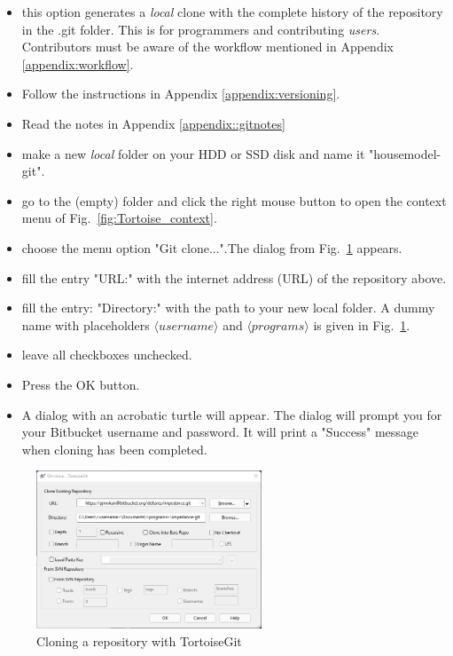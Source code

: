 \begin{itemize}
	\item this option generates a \emph{local} clone with the complete history of the repository in the \textsf{.git} folder. This is for programmers and contributing \emph{users}. Contributors must be aware of the workflow mentioned in Appendix \ref{appendix:workflow}.
    \item Follow the instructions in Appendix \ref{appendix:versioning}. 
    \item Read the notes in Appendix \ref{appendix::gitnotes}
	\item make a new \emph{local} folder on your HDD or SSD disk and name it \textsf{"housemodel-git"}.
	\item go to the (empty) folder and click the right mouse button to open the context menu of Fig.~\ref{fig:Tortoise_context}.
	\item choose the menu option \textsf{"Git clone..."}.The dialog from Fig.~\ref{fig:clone} appears.
	\item fill the entry \textsf{"URL:"} with the internet address (URL) of the repository above.
	\item fill the entry: \textsf{"Directory:"} with the path to your new local folder. A dummy name with placeholders $\langle username \rangle$ and $\langle programs \rangle$ is given in Fig.~\ref{fig:clone}. 
	\item leave all checkboxes unchecked.
	\item Press the OK button.
	\item A dialog with an acrobatic turtle will appear. The dialog will prompt you for your Bitbucket username and password. It will print a "Success" message when cloning has been completed.
\end{itemize}

\begin{figure}[H]
	\centering
	\includegraphics[width=0.6\textwidth]{Figures/Tortoise_clone_impedance}
	\caption{Cloning a repository with TortoiseGit}
	\label{fig:clone}
\end{figure}

